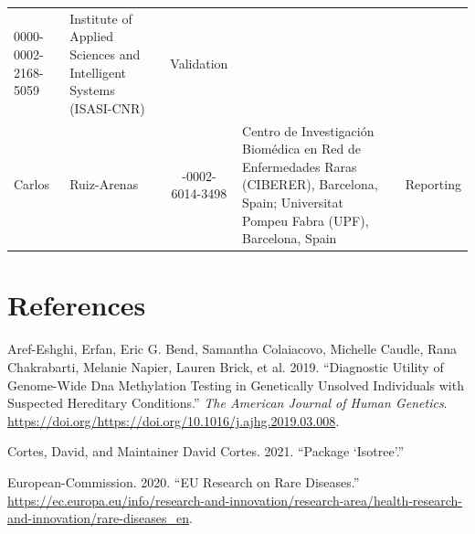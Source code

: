 \documentclass[
]{article}
\begin{document}
\begin{longtable}[]{@{}llcll@{}}
\begin{minipage}[t]{0.15\columnwidth}
0000-0002-2168-5059\strut
\end{minipage} & \begin{minipage}[t]{0.27\columnwidth}\raggedright
Institute of Applied Sciences and Intelligent Systems (ISASI-CNR)\strut
\end{minipage} & \begin{minipage}[t]{0.13\columnwidth}\raggedright
Validation\strut
\end{minipage}\tabularnewline
\begin{minipage}[t]{0.13\columnwidth}\raggedright
Carlos\strut
\end{minipage} & \begin{minipage}[t]{0.19\columnwidth}\raggedright
Ruiz-Arenas\strut
\end{minipage} & \begin{minipage}[t]{0.15\columnwidth}\centering
0000-0002-6014-3498\strut
\end{minipage} & \begin{minipage}[t]{0.27\columnwidth}\raggedright
Centro de Investigación Biomédica en Red de Enfermedades Raras
(CIBERER), Barcelona, Spain; Universitat Pompeu Fabra (UPF), Barcelona,
Spain\strut
\end{minipage} & \begin{minipage}[t]{0.13\columnwidth}\raggedright
Reporting\strut
\end{minipage}\tabularnewline
\bottomrule
\end{longtable}

\hypertarget{references}{%
\section*{References}\label{references}}

\hypertarget{refs}{}
\leavevmode\hypertarget{ref-aref2019}{}%
Aref-Eshghi, Erfan, Eric G. Bend, Samantha Colaiacovo, Michelle Caudle,
Rana Chakrabarti, Melanie Napier, Lauren Brick, et al. 2019.
``Diagnostic Utility of Genome-Wide Dna Methylation Testing in
Genetically Unsolved Individuals with Suspected Hereditary Conditions.''
\emph{The American Journal of Human Genetics}.
\url{https://doi.org/https://doi.org/10.1016/j.ajhg.2019.03.008}.

\leavevmode\hypertarget{ref-cortes2021package}{}%
Cortes, David, and Maintainer David Cortes. 2021. ``Package `Isotree'.''

\leavevmode\hypertarget{ref-EU_RD}{}%
European-Commission. 2020. ``EU Research on Rare Diseases.''
\url{https://ec.europa.eu/info/research-and-innovation/research-area/health-research-and-innovation/rare-diseases_en}.
\end{document}
